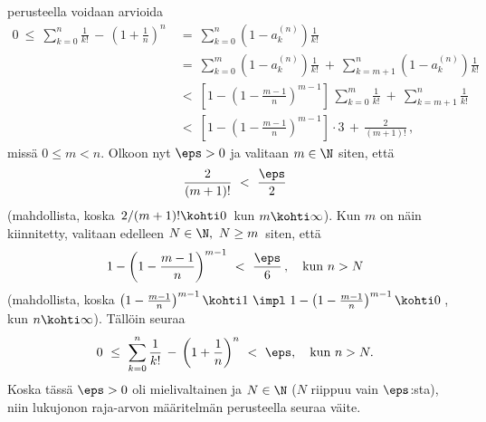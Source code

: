 perusteella voidaan arvioida
\begin{align*}
0\ \le\ \sum_{k=0}^n \frac{1}{k!}\,-\,\left(1+\frac{1}{n}\right)^n\
       &=\ \sum_{k=0}^n \left(1-a_k^{(n)}\right)\frac{1}{k!} \\
       &=\ \sum_{k=0}^m \left(1-a_k^{(n)}\right)\frac{1}{k!}\ 
                          +\ \sum_{k=m+1}^n \left(1-a_k^{(n)}\right)\frac{1}{k!} \\
       &<\ \left[1-\left(1-\frac{m-1}{n}\right)^{m-1}\right]\,\sum_{k=0}^m \frac{1}{k!}\ 
                          +\ \sum_{k=m+1}^n \frac{1}{k!} \\
       &<\ \left[1-\left(1-\frac{m-1}{n}\right)^{m-1}\right] \cdot 3 \,+\, \frac{2}{(m+1)!}\,,
\end{align*}
missä $0 \le m < n$. Olkoon nyt $\eps>0$ ja valitaan $m\in\N$ siten, että
\[
\frac{2}{(m+1)!}\ <\ \frac{\eps}{2}
\]
(mahdollista, koska $\,2/(m+1)! \kohti 0\,$ kun $m\kohti\infty$). Kun $m$ on näin kiinnitetty,
valitaan edelleen $N\in\N,\ N \ge m\,$ siten, että 
\[
1-\left(1-\frac{m-1}{n}\right)^{m-1}\ <\ \frac{\eps}{6}\,, \quad \text{kun}\ n>N
\]
(mahdollista, koska $\left(1-\frac{m-1}{n}\right)^{m-1} \kohti 1\ 
\impl\ 1-\left(1-\frac{m-1}{n}\right)^{m-1} \kohti 0\,$, kun $n\kohti\infty$). Tällöin seuraa
\[
0\ \le\ \sum_{k=0}^n \frac{1}{k!}\,-\,\left(1+\frac{1}{n}\right)^n\ <\ \eps, 
                                                        \quad \text{kun}\ n>N.
\]
Koska tässä $\eps>0$ oli mielivaltainen ja $N\in\N$ ($N$ riippuu vain $\eps$:sta), niin 
lukujonon raja-arvon määritelmän perusteella seuraa väite. \loppu

